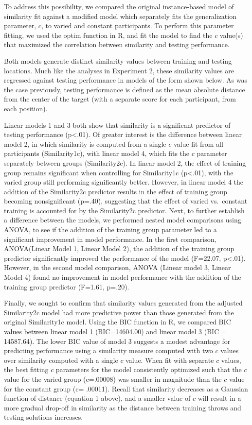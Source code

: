 \documentclass[
  11pt,
  letterpaper,
]{article}
\begin{document}
To address this possibility, we compared the original instance-based
model of similarity fit against a modified model which separately fits
the generalization parameter, \(c\), to varied and constant
participants. To perform this parameter fitting, we used the optim
function in R, and fit the model to find the \(c\) value(s) that
maximized the correlation between similarity and testing performance.

Both models generate distinct similarity values between training and
testing locations. Much like the analyses in Experiment 2, these
similarity values are regressed against testing performance in models of
the form shown below. As was the case previously, testing performance is
defined as the mean absolute distance from the center of the target
(with a separate score for each participant, from each position).

Linear models 1 and 3 both show that similarity is a significant
predictor of testing performance (p\textless.01). Of greater interest is
the difference between linear model 2, in which similarity is computed
from a single \(c\) value fit from all participants (Similarity1c), with
linear model 4, which fits the \(c\) parameter separately between groups
(Similarity2c). In linear model 2, the effect of training group remains
significant when controlling for Similarity1c (p\textless.01), with the
varied group still performing significantly better. However, in linear
model 4 the addition of the Similarity2c predictor results in the effect
of training group becoming nonsignificant (p=.40), suggesting that the
effect of varied vs.~constant training is accounted for by the
Similarity2c predictor. Next, to further establish a difference between
the models, we performed nested model comparisons using ANOVA, to see if
the addition of the training group parameter led to a significant
improvement in model performance. In the first comparison, ANOVA(Linear
Model 1, Linear Model 2), the addition of the training group predictor
significantly improved the performance of the model (F=22.07,
p\textless.01). However, in the second model comparison, ANOVA (Linear
model 3, Linear Model 4) found no improvement in model performance with
the addition of the training group predictor (F=1.61, p=.20).

Finally, we sought to confirm that similarity values generated from the
adjusted Similarity2c model had more predictive power than those
generated from the original Similarity1c model. Using the BIC function
in R, we compared BIC values between linear model 1 (BIC=14604.00) and
linear model 3 (BIC = 14587.64). The lower BIC value of model 3 suggests
a modest advantage for predicting performance using a similarity measure
computed with two \(c\) values over similarity computed with a single
\(c\) value. When fit with separate \(c\) values, the best fitting \(c\)
parameters for the model consistently optimized such that the \(c\)
value for the varied group (c=.00008) was smaller in magnitude than the
\(c\) value for the constant group (c= .00011). Recall that similarity
decreases as a Gaussian function of distance (equation 1 above), and a
smaller value of \(c\) will result in a more gradual drop-off in
similarity as the distance between training throws and testing solutions
increases.
\end{document}
